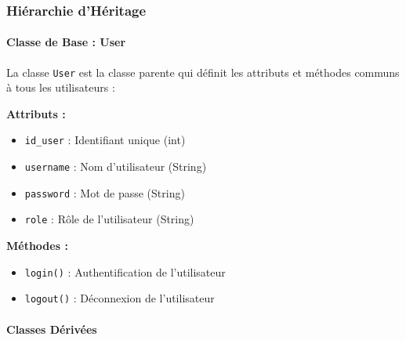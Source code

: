 \documentclass[12pt,a4paper]{report}
\begin{document}
\subsubsection{Hiérarchie d'Héritage}

\paragraph{Classe de Base : User}

La classe \texttt{User} est la classe parente qui définit les attributs et méthodes communs à tous les utilisateurs :

\textbf{Attributs :}
\begin{itemize}
    \item \texttt{id\_user} : Identifiant unique (int)
    \item \texttt{username} : Nom d'utilisateur (String)
    \item \texttt{password} : Mot de passe (String)
    \item \texttt{role} : Rôle de l'utilisateur (String)
\end{itemize}

\textbf{Méthodes :}
\begin{itemize}
    \item \texttt{login()} : Authentification de l'utilisateur
    \item \texttt{logout()} : Déconnexion de l'utilisateur
\end{itemize}

\paragraph{Classes Dérivées}
\end{document}
